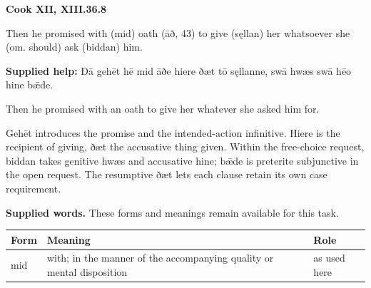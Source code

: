 \par\begin{minipage}{\linewidth}\raggedright
\textbf{Cook XII, XIII.36.8}

Then he promised with (mid) oath (āð, 43) to give (sęllan) her whatsoever she (om. should) ask (biddan) him.

\textbf{Supplied help:} Ðā gehēt hē mid āðe hiere ðæt tō sęllanne, swā hwæs swā hēo hine bǣde.

Then he promised with an oath to give her whatever she asked him for.

Gehēt introduces the promise and the intended-action infinitive. Hiere is the recipient of giving, ðæt the accusative thing given. Within the free-choice request, biddan takes genitive hwæs and accusative hine; bǣde is preterite subjunctive in the open request. The resumptive ðæt lets each clause retain its own case requirement.

\end{minipage}\par\addvspace{4pt}

\textbf{Supplied words.} These forms and meanings remain available for this task.

\par\begingroup
\fontsize{10.5}{13.2}\selectfont
\setlength{\LTleft}{0pt}\setlength{\LTright}{\fill}
\noindent
\begin{tabular}{@{}>{\raggedright\arraybackslash}p{20.53mm}>{\raggedright\arraybackslash}p{77.31mm}>{\raggedright\arraybackslash}p{20.53mm}@{}}
\toprule
\textbf{Form} & \textbf{Meaning} & \textbf{Role} \\
\midrule
mid & with; in the manner of the accompanying quality or mental disposition & as used here \\
\bottomrule
\end{tabular}
\par\endgroup


